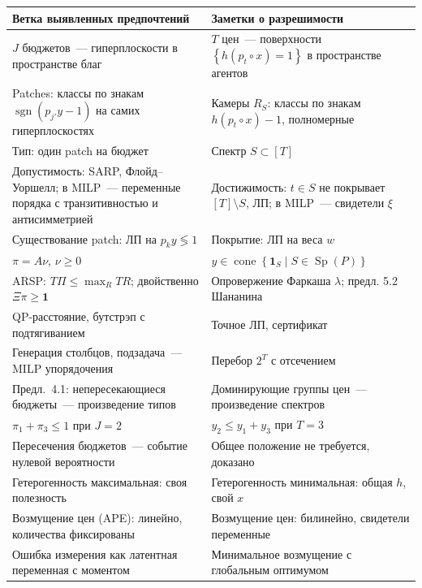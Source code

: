 \documentclass[a4paper,11pt]{article}
\theoremstyle{plain}
\theoremstyle{definition}
\theoremstyle{remark}
\newcommand{\set}[1]{\left\{ #1 \right\}}
\DeclareMathOperator{\cone}{cone}
\DeclareMathOperator{\Sp}{Sp}
\begin{document}
\begin{center}
\renewcommand{\arraystretch}{1.25}
\begin{tabular}{>{\raggedright\arraybackslash}p{}>{\raggedright\arraybackslash}p{}}
\hline
Ветка выявленных предпочтений & Заметки о разрешимости\\
\hline
$J$ бюджетов~--- гиперплоскости в пространстве благ & $T$ цен~--- поверхности $\set{h(p_t\circ x)=1}$ в пространстве агентов\\
Patches: классы по знакам $\operatorname{sgn}(p_{j'}y-1)$ на самих гиперплоскостях & Камеры $R_S$: классы по знакам $h(p_t\circ x)-1$, полномерные\\
Тип: один patch на бюджет & Спектр $S\subset[T]$\\
Допустимость: SARP, Флойд--Уоршелл; в MILP~--- переменные порядка с транзитивностью и антисимметрией & Достижимость: $t\in S$ не покрывает $[T]\setminus S$, ЛП; в MILP~--- свидетели $\xi$\\
Существование patch: ЛП на $p_ky\lessgtr1$ & Покрытие: ЛП на веса $w$\\
$\pi=A\nu$, $\nu\ge0$ & $y\in\cone\set{\mathbf 1_S\mid S\in\Sp(P)}$\\
ARSP: $T\Pi\le\max_RTR$; двойственно $\Xi\pi\ge\mathbf 1$ & Опровержение Фаркаша $\lambda$; предл. 5.2 Шананина\\
QP-расстояние, бутстрэп с подтягиванием & Точное ЛП, сертификат\\
Генерация столбцов, подзадача~--- MILP упорядочения & Перебор $2^T$ с отсечением\\
Предл.~4.1: непересекающиеся бюджеты~--- произведение типов & Доминирующие группы цен~--- произведение спектров\\
$\pi_1+\pi_3\le1$ при $J=2$ & $y_2\le y_1+y_3$ при $T=3$\\
Пересечения бюджетов~--- событие нулевой вероятности & Общее положение не требуется, доказано\\
Гетерогенность максимальная: своя полезность & Гетерогенность минимальная: общая $h$, свой $x$\\
Возмущение цен (APE): линейно, количества фиксированы & Возмущение цен: билинейно, свидетели переменные\\
Ошибка измерения как латентная переменная с моментом & Минимальное возмущение с глобальным оптимумом\\
\hline
\end{tabular}
\end{center}
\end{document}
